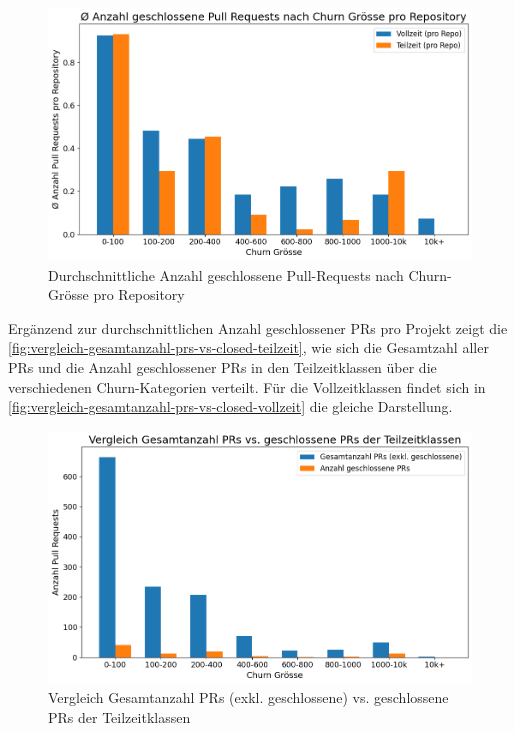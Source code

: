 \begin{figure}[htbp]
    \includegraphics[width=\textwidth]{Figures/avg-anz-clsd-prs-nach-churn.png}
    \caption{Durchschnittliche Anzahl geschlossene Pull-Requests nach Churn-Grösse pro Repository}
    \label{fig:avg-anz-clsd-prs-nach-churn}
\end{figure}

\newpage
Ergänzend zur durchschnittlichen Anzahl geschlossener PRs pro Projekt zeigt die \autoref{fig:vergleich-gesamtanzahl-prs-vs-closed-teilzeit}, wie sich die Gesamtzahl aller PRs und die Anzahl geschlossener PRs in den Teilzeitklassen über die verschiedenen Churn-Kategorien verteilt. Für die Vollzeitklassen findet sich in \autoref{fig:vergleich-gesamtanzahl-prs-vs-closed-vollzeit} die gleiche Darstellung.

\begin{figure}[htbp]
    \includegraphics[width=\textwidth]{Figures/vergleich-gesamtanzahl-prs-vs-closed-teilzeit.png}
    \caption{Vergleich Gesamtanzahl PRs (exkl. geschlossene) vs. geschlossene PRs der Teilzeitklassen}
    \label{fig:vergleich-gesamtanzahl-prs-vs-closed-teilzeit}
\end{figure}

